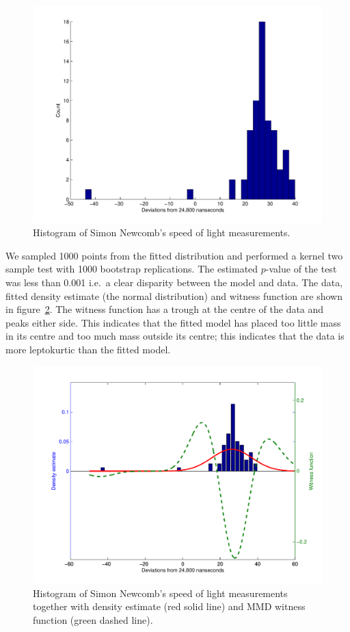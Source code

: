 \documentclass{article}
\def\ie{i.e.\ }
\begin{document}
\begin{figure}[ht]
\centering
\includegraphics[width=0.98\columnwidth]{figures/newcomb_hist}
\caption{
Histogram of Simon Newcomb's speed of light measurements.
}
\label{fig:newcomb_hist}
\end{figure}

We sampled 1000 points from the fitted distribution and performed a kernel two sample test with 1000 bootstrap replications.
The estimated $p$-value of the test was less than 0.001 \ie a clear disparity between the model and data.
The data, fitted density estimate (the normal distribution) and witness function are shown in figure~\ref{fig:newcomb_witness_1}.
The witness function has a trough at the centre of the data and peaks either side.
This indicates that the fitted model has placed too little mass in its centre and too much mass outside its centre; this indicates that the data is more leptokurtic than the fitted model.

\begin{figure}[ht]
\centering
\includegraphics[width=0.98\columnwidth]{figures/newcomb_witness_1}
\caption{
Histogram of Simon Newcomb's speed of light measurements together with density estimate (red solid line) and MMD witness function (green dashed line).
}
\label{fig:newcomb_witness_1}
\end{figure}
\end{document}

